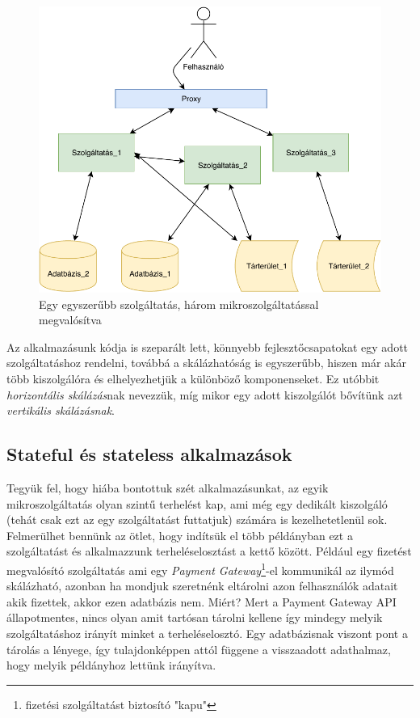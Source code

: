 \begin{figure}[!ht]
\centering
\includegraphics[width=125mm, keepaspectratio]{img/app_micro.pdf}
\caption{Egy egyszerűbb szolgáltatás, három mikroszolgáltatással megvalósítva}
\end{figure}
\vskip 0.1in
Az alkalmazásunk kódja is szeparált lett, könnyebb fejlesztőcsapatokat egy adott szolgáltatáshoz rendelni, továbbá a skálázhatóság is egyszerűbb, hiszen már akár több kiszolgálóra és elhelyezhetjük a különböző komponenseket. Ez utóbbit \textit{horizontális skálázás}nak nevezzük, míg mikor egy adott kiszolgálót bővítünk azt \textit{vertikális skálázásnak}.
\subsection{Stateful és stateless alkalmazások}
Tegyük fel, hogy hiába bontottuk szét alkalmazásunkat, az egyik mikroszolgáltatás olyan szintű terhelést kap, ami még egy dedikált kiszolgáló (tehát csak ezt az egy szolgáltatást futtatjuk) számára is kezelhetetlenül sok. Felmerülhet bennünk az ötlet, hogy indítsük el több példányban ezt a szolgáltatást és alkalmazzunk terheléselosztást a kettő között. Például egy fizetést megvalósító szolgáltatás ami egy \textit{Payment Gateway}\footnote{fizetési szolgáltatást biztosító "kapu"}-el kommunikál az ilymód skálázható, azonban ha mondjuk szeretnénk eltárolni azon felhasználók adatait akik fizettek, akkor ezen adatbázis nem. Miért? Mert a Payment Gateway API állapotmentes, nincs olyan amit tartósan tárolni kellene így mindegy melyik szolgáltatáshoz irányít minket a terheléselosztó. Egy adatbázisnak viszont pont a tárolás a lényege, így tulajdonképpen attól függene a visszaadott adathalmaz, hogy melyik példányhoz lettünk irányítva.

